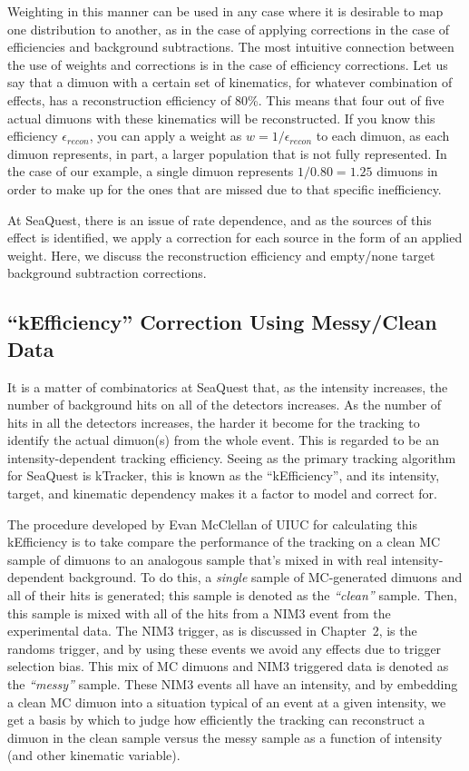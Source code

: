 Weighting in this manner can be used in any case where it is desirable to map one distribution to another, as in the case of applying corrections in the case of efficiencies and background subtractions. The most intuitive connection between the use of weights and corrections is in the case of efficiency corrections. Let us say that a dimuon with a certain set of kinematics, for whatever combination of effects, has a reconstruction efficiency of 80\%. This means that four out of five actual dimuons with these kinematics will be reconstructed. If you know this efficiency $\epsilon_{recon}$, you can apply a weight as $w = 1/\epsilon_{recon}$ to each dimuon, as each dimuon represents, in part, a larger population that is not fully represented. In the case of our example, a single dimuon represents $1/0.80 = 1.25$ dimuons in order to make up for the ones that are missed due to that specific inefficiency.

At SeaQuest, there is an issue of rate dependence, and as the sources of this effect is identified, we apply a correction for each source in the form of an applied weight. Here, we discuss the reconstruction efficiency and empty/none target background subtraction corrections.

\subsection{``kEfficiency'' Correction Using Messy/Clean Data}

It is a matter of combinatorics at SeaQuest that, as the intensity increases, the number of background hits on all of the detectors increases. As the number of hits in all the detectors increases, the harder it become for the tracking to identify the actual dimuon(s) from the whole event. This is regarded to be an intensity-dependent tracking efficiency. Seeing as the primary tracking algorithm for SeaQuest is kTracker, this is known as the ``kEfficiency'', and its intensity, target, and kinematic dependency makes it a factor to model and correct for.

The procedure developed by Evan McClellan of UIUC for calculating this kEfficiency is to take compare the performance of the tracking on a clean MC sample of dimuons to an analogous sample that's mixed in with real intensity-dependent background. To do this, a \emph{single} sample of MC-generated dimuons and all of their hits is generated; this sample is denoted as the \emph{``clean''} sample. Then, this sample is mixed with all of the hits from a NIM3 event from the experimental data. The NIM3 trigger, as is discussed in Chapter~2, is the randoms trigger, and by using these events we avoid any effects due to trigger selection bias. This mix of MC dimuons and NIM3 triggered data is denoted as the \emph{``messy''} sample. These NIM3 events all have an intensity, and by embedding a clean MC dimuon into a situation typical of an event at a given intensity, we get a basis by which to judge how efficiently the tracking can reconstruct a dimuon in the clean sample versus the messy sample as a function of intensity (and other kinematic variable).

